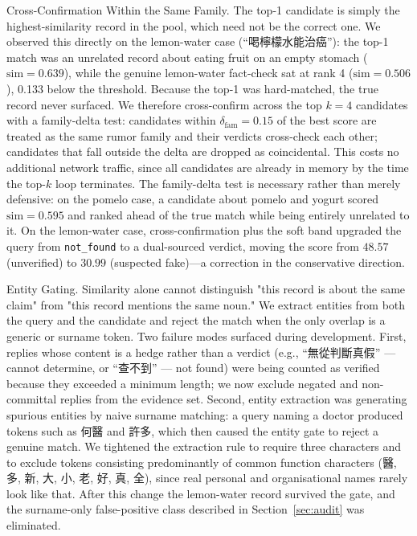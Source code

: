\documentclass[twoside]{llncs}
\newcommand{\zh}[1]{{\CJKfamily{zh}#1}}
\begin{document}
Cross-Confirmation Within the Same Family.
The top-1 candidate is simply the highest-similarity record in the pool, which need not be the correct one. We observed this directly on the lemon-water case (``\zh{喝檸檬水能治癌}''): the top-1 match was an unrelated record about eating fruit on an empty stomach ($\text{sim} = 0.639$), while the genuine lemon-water fact-check sat at rank 4 ($\text{sim} = 0.506$), 0.133 below the threshold. Because the top-1 was hard-matched, the true record never surfaced. We therefore cross-confirm across the top $k=4$ candidates with a family-delta test: candidates within $\delta_{\text{fam}} = 0.15$ of the best score are treated as the same rumor family and their verdicts cross-check each other; candidates that fall outside the delta are dropped as coincidental. This costs no additional network traffic, since all candidates are already in memory by the time the top-$k$ loop terminates. The family-delta test is necessary rather than merely defensive: on the pomelo case, a candidate about pomelo and yogurt scored $\text{sim} = 0.595$ and ranked ahead of the true match while being entirely unrelated to it. On the lemon-water case, cross-confirmation plus the soft band upgraded the query from \texttt{not\_found} to a dual-sourced verdict, moving the score from $48.57$ (unverified) to $30.99$ (suspected fake)---a correction in the conservative direction.

Entity Gating.
Similarity alone cannot distinguish "this record is about the same claim" from "this record mentions the same noun." We extract entities from both the query and the candidate and reject the match when the only overlap is a generic or surname token. Two failure modes surfaced during development. First, replies whose content is a hedge rather than a verdict (e.g., ``\zh{無從判斷真假}'' --- cannot determine, or ``\zh{查不到}'' --- not found) were being counted as verified because they exceeded a minimum length; we now exclude negated and non-committal replies from the evidence set. Second, entity extraction was generating spurious entities by naive surname matching: a query naming a doctor produced tokens such as \zh{何醫} and \zh{許多}, which then caused the entity gate to reject a genuine match. We tightened the extraction rule to require three characters and to exclude tokens consisting predominantly of common function characters (\zh{醫, 多, 新, 大, 小, 老, 好, 真, 全}), since real personal and organisational names rarely look like that. After this change the lemon-water record survived the gate, and the surname-only false-positive class described in Section~\ref{sec:audit} was eliminated.
\end{document}
